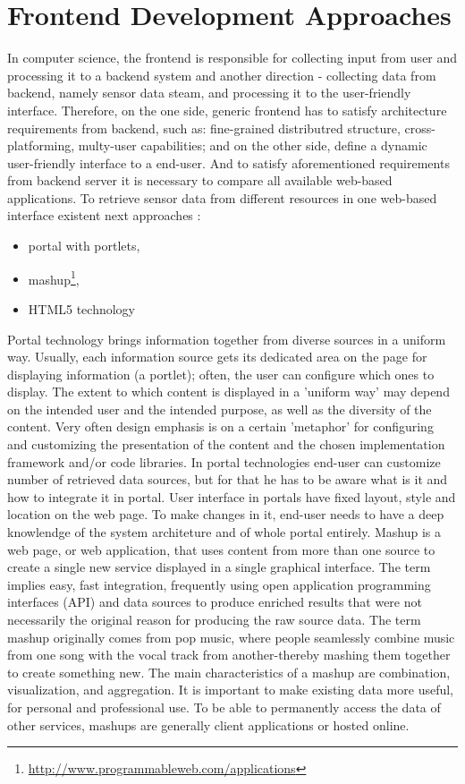 \section{Frontend Development Approaches}
In computer science, the frontend is responsible for collecting input from user and processing it to a backend system and another direction - collecting data from backend, namely sensor data steam, and processing it to the user-friendly interface. Therefore, on the one side, generic frontend has to satisfy architecture requirements from backend, such as: fine-grained distributred structure, cross-platforming, multy-user capabilities; and on the other side, define a dynamic user-friendly interface to a end-user. And to satisfy aforementioned requirements from backend server it is necessary to compare all available web-based applications.
\newline
To retrieve sensor data from different resources in one web-based interface existent next approaches :
\begin{itemize}
 \item portal with portlets,
 \item mashup\footnote{\url{http://www.programmableweb.com/applications}},
 \item HTML5 technology
\end{itemize}
Portal technology brings information together from diverse sources in a uniform way. Usually, each information source gets its dedicated area on the page for displaying information (a portlet); often, the user can configure which ones to display. The extent to which content is displayed in a 'uniform way' may depend on the intended user and the intended purpose, as well as the diversity of the content. Very often design emphasis is on a certain 'metaphor' for configuring and customizing the presentation of the content and the chosen implementation framework and/or code libraries\cite{pautasso2008restful,seong2006usability}. In portal technologies end-user can customize number of retrieved data sources, but for that he has to be aware what is it and how to integrate it in portal. User interface in portals have fixed layout, style and location on the web page. To make changes in it, end-user needs to have a deep knowlendge of the system architeture and of whole portal entirely.
 \newline
Mashup is a web page, or web application, that uses content from more than one source to create a single new service displayed in a single graphical interface. The term implies easy, fast integration, frequently using open application programming interfaces (API) and data sources to produce enriched results that were not necessarily the original reason for producing the raw source data. The term mashup originally comes from pop music, where people seamlessly combine music from one song with the vocal track from another-thereby mashing them together to create something new. The main characteristics of a mashup are combination, visualization, and aggregation. It is important to make existing data more useful, for personal and professional use. To be able to permanently access the data of other services, mashups are generally client applications or hosted online.
